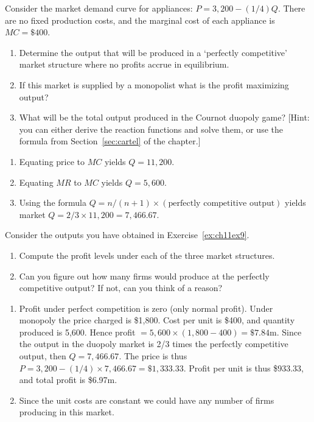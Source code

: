 \begin{enumialphparenastyle}
\begin{ex}\label{ex:ch11ex9}
Consider the market demand curve for appliances: $P=3,200-(1/4)Q$. There are no fixed production costs, and the marginal cost of each appliance is $MC=\$400$.
\begin{enumerate}
	\item	Determine the output that will be produced in a `perfectly competitive' market structure where no profits accrue in equilibrium.
	\item	If this market is supplied by a monopolist what is the profit maximizing output?
	\item	What will be the total output produced in the Cournot duopoly game? [Hint: you can either derive the reaction functions and solve them, or use the formula from Section~\ref{sec:cartel} of the chapter.]
\end{enumerate}
\begin{sol}
\begin{enumerate}
	\item	Equating price to $MC$ yields $Q=11,200$.
	\item	Equating $MR$ to $MC$ yields $Q=5,600$.
	\item	Using the formula $Q=n/(n+1)\times(\text{perfectly competitive output})$ yields market $Q=2/3\times 11,200=7,466.67$.
\end{enumerate}
\end{sol}
\end{ex}

\begin{ex}\label{ex:ch11ex10}
Consider the outputs you have obtained in Exercise~\ref{ex:ch11ex9}.
\begin{enumerate}
	\item	Compute the profit levels under each of the three market structures.
	\item	Can you figure out how many firms would produce at the perfectly competitive output? If not, can you think of a reason?
\end{enumerate}
\begin{sol}
\begin{enumerate}
	\item	Profit under perfect competition is zero (only normal profit). Under monopoly the price charged is \$1,800. Cost per  unit is \$400, and quantity produced is 5,600. Hence profit $=5,600\times(1,800-400)=\$7.84$m. Since the output in the duopoly market is 2/3 times the perfectly competitive output, then $Q=7,466.67$. The price is thus $P=3,200-(1/4)\times 7,466.67=\$1,333.33$. Profit per unit is thus \$933.33, and total profit is \$6.97m.
	\item	Since the unit costs are constant we could have any number of firms producing in this market.
\end{enumerate}
\end{sol}
\end{ex}


\end{enumialphparenastyle}
